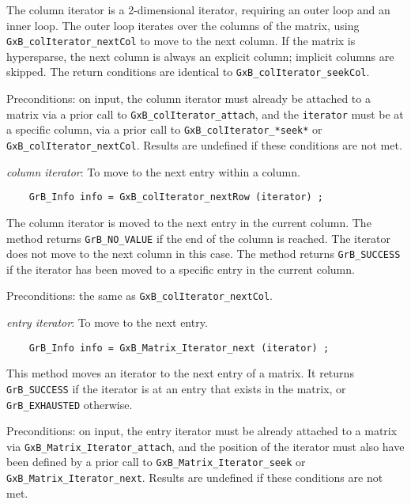 \documentclass[12pt]{article}
\begin{document}
{\begin{enumerate}
    The column iterator is a 2-dimensional iterator, requiring an outer loop
    and an inner loop.  The outer loop iterates over the columns of the matrix,
    using \verb'GxB_colIterator_nextCol' to move to the next column.  If the
    matrix is hypersparse, the next column is always an explicit column;
    implicit columns are skipped.  The return conditions are identical to
    \verb'GxB_colIterator_seekCol'.

    Preconditions: on input, the column iterator must already be attached to a
    matrix via a prior call to \verb'GxB_colIterator_attach', and the
    \verb'iterator' must be at a specific column, via a prior call to
    \verb'GxB_colIterator_*seek*' or \verb'GxB_colIterator_nextCol'.
    Results are undefined if these conditions are not met.

    {\footnotesize
    \item {\em column iterator}:  To move to the next entry within a column.

    \begin{verbatim}
    GrB_Info info = GxB_colIterator_nextRow (iterator) ; \end{verbatim}}

    The column iterator is moved to the next entry in the current column.
    The method returns \verb'GrB_NO_VALUE' if the end of the column is reached.
    The iterator does not move to the next column in this case.
    The method returns \verb'GrB_SUCCESS' if the iterator has been moved
    to a specific entry in the current column.

    Preconditions: the same as \verb'GxB_colIterator_nextCol'.

    \item {\em entry iterator}: To move to the next entry.
    {\footnotesize
    \begin{verbatim}
    GrB_Info info = GxB_Matrix_Iterator_next (iterator) ; \end{verbatim}}

    This method moves an iterator to the next entry of a matrix.
    It returns \verb'GrB_SUCCESS' if the iterator is at an entry that
    exists in the matrix, or \verb'GrB_EXHAUSTED' otherwise.

    Preconditions: on input, the entry iterator must be already attached to a
    matrix via \verb'GxB_Matrix_Iterator_attach', and the position of the
    iterator must also have been defined by a prior call to
    \verb'GxB_Matrix_Iterator_seek' or \verb'GxB_Matrix_Iterator_next'.
    Results are undefined if these conditions are not met.


\end{enumerate}}
\end{document}
